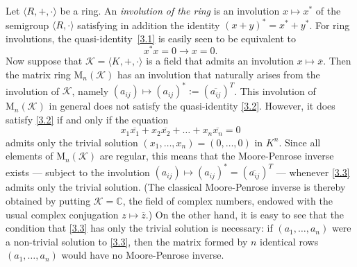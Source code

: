 \documentclass[11pt,reqno]{amsart}
\numberwithin{equation}{section}
\def\bb{\mathbb}
\theoremstyle{remark}
\def\ol{\overline}
\begin{document}
Let $\langle R,+,\cdot\rangle$ be a ring. An \emph{involution of
the ring} is an involution $x\mapsto x^*$ of the semigroup
$\langle R,\cdot\rangle$ satisfying in addition the identity
$(x+y)^*=x^* +y^*$. For ring involutions, the
quasi-identity~\eqref{3.1} is easily seen to be equivalent to
\begin{equation}
\label{3.2} x^*x=0\rightarrow x=0.
\end{equation}
Now suppose that $\mathcal{K}=\langle K,+,\cdot\rangle$ is a field
that admits an involution $x\mapsto\ol x$. Then the matrix ring
$\mathrm{M}_n(\mathcal{K})$ has an involution that naturally
arises from the involution of $\mathcal{K}$, namely
$(a_{ij})\mapsto(a_{ij})^*:=(\ol{a_{ij}})^T$. This involution of
$\mathrm{M}_n(\mathcal{K})$ in general does not satisfy the
quasi-identity \eqref{3.2}. However, it does satisfy \eqref{3.2}
if and only if the equation
\begin{equation} \label{3.3}
x_1\ol{x_1}+x_2\ol{x_2}+\dots+x_n\ol{x_n}=0
\end{equation}
admits only the trivial solution $(x_1,\dots,x_n)=(0,\dots,0)$ in
$K^n$. Since all elements of $\mathrm{M}_n(\mathcal{K})$ are
regular, this means that the Moore-Penrose inverse exists ---
subject to the  involution $(a_{ij})\mapsto
(a_{ij})^*=(\ol{a_{ij}})^T$ --- whenever \eqref{3.3} admits only
the trivial solution. (The classical Moore-Penrose inverse is
thereby obtained by putting $\mathcal{K}=\bb C$, the field of
complex numbers, endowed with the usual complex conjugation
$z\mapsto \ol z$.) On the other hand, it is easy to see that the
condition that \eqref{3.3} has only the trivial solution is
necessary: if $(a_1,\dots,a_n)$ were a non-trivial solution to
\eqref{3.3}, then the matrix formed by $n$ identical rows
$(a_1,\dots,a_n)$ would have no Moore-Penrose inverse.
\end{document}
